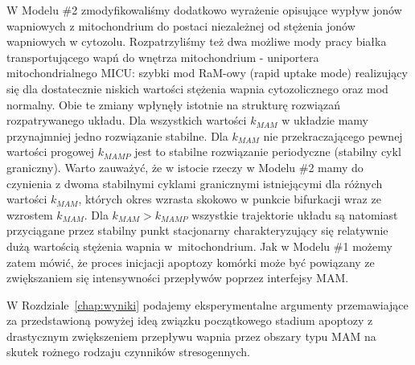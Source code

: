 W Modelu \#2 zmodyfikowaliśmy dodatkowo wyrażenie opisujące wypływ jonów wapniowych z mitochondrium do postaci niezależnej od stężenia jonów wapniowych w cytozolu. Rozpatrzyliśmy też dwa możliwe mody pracy białka transportującego wapń do wnętrza mitochondrium - uniportera mitochondrialnego MICU: szybki mod RaM-owy (rapid uptake mode) realizujący się dla dostatecznie niskich wartości stężenia wapnia cytozolicznego oraz mod normalny. Obie te zmiany wpłynęły istotnie na strukturę rozwiązań rozpatrywanego układu. Dla wszystkich wartości $k_{MAM}$ w układzie mamy przynajmniej jedno rozwiązanie stabilne. Dla $k_{MAM}$ nie przekraczającego pewnej wartości progowej $k_{MAMP}$ jest to stabilne rozwiązanie periodyczne (stabilny cykl graniczny). Warto zauważyć, że w istocie rzeczy w Modelu \#2 mamy do czynienia z dwoma stabilnymi cyklami granicznymi istniejącymi dla różnych wartości $k_{MAM}$, których okres wzrasta skokowo  w punkcie bifurkacji wraz ze wzrostem $k_{MAM}$. Dla $k_{MAM} > k_{MAMP}$ wszystkie trajektorie układu są natomiast przyciągane przez stabilny punkt stacjonarny charakteryzujący się relatywnie dużą wartością stężenia wapnia w~mitochondrium. Jak w Modelu \#1 możemy zatem mówić, że proces inicjacji apoptozy komórki może być powiązany ze zwiększaniem się intensywności przepływów poprzez interfejsy MAM. 

\medskip 

W Rozdziale~\ref{chap:wyniki} podajemy eksperymentalne argumenty przemawiające za przedstawioną powyżej ideą związku początkowego stadium apoptozy z drastycznym zwiększeniem przepływu wapnia przez obszary typu MAM na skutek rożnego rodzaju czynników stresogennych.


